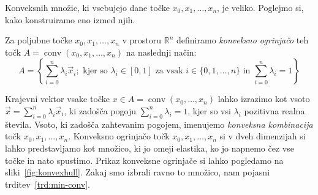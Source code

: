 \documentclass[mat1]{fmfdelo}
\newcommand{\R}{\mathbb R}
\DeclareMathOperator{\conv}{conv}
\newcommand{\0}{\underline{0}}
\begin{document}
Konveksnih množic, ki vsebujejo dane točke $x_0, x_1, \dots, x_n$, je veliko. Poglejmo si, kako konstruiramo eno izmed njih.
\begin{definicija}
Za poljubne točke $x_0, x_1, \dots, x_n$ v prostoru $\R^n$ definiramo \emph{konveksno ogrinjačo} teh točk $A = \conv(x_0, x_1, \dots, x_n)$ na naslednji način:
$$A = \left \{ \sum\limits_{i=0}^n \lambda_i \vec{x}_i; \text{ kjer so } \lambda_i \in [0, 1] \text{ za vsak } i \in \{0, 1, \dots, n \} \text{ in } \sum\limits_{i=0}^n \lambda_i = 1  \right \}$$
\end{definicija}

Krajevni vektor vsake točke $x \in A = \conv (x_0, \dots, x_n)$ lahko izrazimo kot vsoto $\vec{x} = \sum\limits_{i=0}^n \lambda_i \vec{x}_i$, ki zadošča pogoju $\sum\limits_{i=0}^n \lambda_i = 1$, kjer so vsi $\lambda_i$ pozitivna realna števila. Vsoto, ki zadošča zahtevanim pogojem, imenujemo \emph{konveksna kombinacija} točk $x_0, x_1, \dots , x_n$. Konveksno  ogrinjačo točk $x_0, x_1, \dots, x_n$ si v dveh dimenzijah si lahko predstavljamo kot množico, ki jo omeji elastika, ko jo napnemo čez vse točke in nato spustimo. Prikaz konveksne ogrinjače si lahko pogledamo na sliki~\ref{fig:konvexhull}. Zakaj smo izbrali ravno to množico, nam pojasni trditev~\ref{trd:min-conv}.
\end{document}
